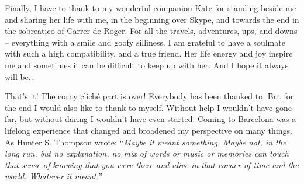 \begin{acknowledgements}
Finally, I have to thank to my wonderful companion Kate for standing beside me and sharing her life with me, in the beginning over Skype, and towards the end in the sobreatico of Carrer de Roger. For all the travels, adventures, ups, and downs -- everything with a smile and goofy silliness. I am grateful to have a soulmate with such a high compatibility, and a true friend. Her life energy and joy inspire me and sometimes it can be difficult to keep up with her. And I hope it always will be...

That's it! The corny cliché part is over! Everybody has been thanked to. But for the end I would also like to thank to myself. Without help I wouldn't have gone far, but without daring I wouldn't have even started. Coming to Barcelona was a lifelong experience that changed and broadened my perspective on many things. As Hunter S. Thompson wrote: “\textit{Maybe it meant something. Maybe not, in the long run, but no explanation, no mix of words or music or memories can touch that sense of knowing that you were there and alive in that corner of time and the world. Whatever it meant.}”

\end{acknowledgements}